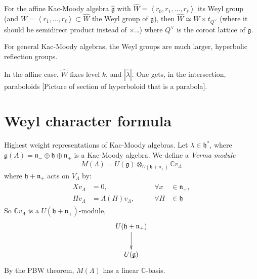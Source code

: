 \begin{proposition}
\label{proposition-Weyl-group-of-affine-Kac-Moody-algebra}
For the affine Kac-Moody algebra $\hat{\mathfrak{g}}$
 with $\hat{W}=\left<r_0,r_1,\ldots,r_\ell\right>$ its Weyl group 
(and $W=\left<r_1,\ldots,r_\ell\right>\subset \hat{W}$ the Weyl group of
$\mathfrak{g}$), then $\hat{W} \simeq W\times t_{Q^\vee}$ (where it should be
semidirect product instead of $\times$…) where $Q^\vee$ is the
coroot lattice of $\mathfrak{g}$.
\end{proposition}

\begin{remark}
\label{remark-Weyl-groups-are-large-for-other-Kac-Moody-algebras}
For general Kac-Moody algebras, the Weyl groups are much larger, hyperbolic
reflection groups.
\end{remark}

In the affine case, $\hat{W}$ fixes level $k$, and $|\hat{\lambda}|$. One gets,
in the intersection, paraboloids [Picture of section of hyperboloid that is a
parabola].

\section{Weyl character formula}
\label{section-Weyl-character-formula}
Highest weight representations of Kac-Moody algebras. 
Let $\lambda \in \mathfrak{h}^*$, where
$\mathfrak{g}(A)=\mathfrak{n}_-\oplus\mathfrak{h}\oplus \mathfrak{n}_+$ 
is a Kac-Moody algebra. We define a {\it Verma module} 
$$
M(\Lambda)
=U(\mathfrak{g}) \otimes_{U(\mathfrak{h}+\mathfrak{n}_+)}\mathbb{C}v_\Lambda
$$
where $\mathfrak{h}+\mathfrak{n}_+$ acts on $V_\Lambda$ by:
\begin{align*}
\begin{aligned}
Xv_\Lambda&=0,\qquad &\forall x &\in \mathfrak{n}_+,\\
Hv_\Lambda&=\Lambda(H)v_\Lambda,\qquad &\forall H &\in \mathfrak{h}
\end{aligned}
\end{align*}
So $\mathbb{C} v_\Lambda$ is a $U(\mathfrak{h}+\mathfrak{n}_+)$-module,
$$
\xymatrix{
U(\mathfrak{h}+\mathfrak{n}_+)\ar[d]\\
U(\mathfrak{g})
}
$$
By the PBW theorem, $M(\Lambda)$ has a linear $\mathbb{C}$-basis.

